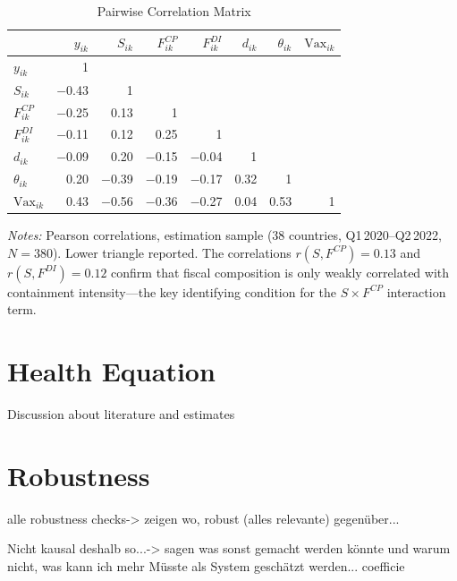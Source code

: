 \documentclass[12pt, a4paper]{article}
\begin{document}
\begin{table}[H]
\centering
\caption{Pairwise Correlation Matrix}
\label{tab:corr_matrix}
\scriptsize
\begin{tabular}{@{} l r r r r r r r @{}}
\toprule
 & $y_{ik}$ & $S_{ik}$ & $F^{CP}_{ik}$ & $F^{DI}_{ik}$
 & $d_{ik}$ & $\theta_{ik}$ & $\text{Vax}_{ik}$ \\
\midrule
$y_{ik}$           & 1    &       &       &       &       &       &  \\
$S_{ik}$           & $-$0.43 & 1  &       &       &       &       &  \\
$F^{CP}_{ik}$      & $-$0.25 & 0.13  & 1  &       &       &       &  \\
$F^{DI}_{ik}$      & $-$0.11 & 0.12  & 0.25  & 1  &       &       &  \\
$d_{ik}$           & $-$0.09 & 0.20  & $-$0.15 & $-$0.04 & 1  &       &  \\
$\theta_{ik}$      & 0.20  & $-$0.39 & $-$0.19 & $-$0.17 & 0.32  & 1  &  \\
$\text{Vax}_{ik}$  & 0.43  & $-$0.56 & $-$0.36 & $-$0.27 & 0.04  & 0.53  & 1 \\
\bottomrule
\end{tabular}
\vspace{4pt}

\parbox{\textwidth}{\scriptsize\textit{Notes:} Pearson correlations,
estimation sample (38 countries, Q1\,2020--Q2\,2022, $N = 380$).
Lower triangle reported. The correlations
$r(S, F^{CP}) = 0.13$ and $r(S, F^{DI}) = 0.12$ confirm that fiscal
composition is only weakly correlated with containment intensity---the
key identifying condition for the $S \times F^{CP}$ interaction term.}
\end{table}


\section{Health Equation}
\label{app:health_estimations}

Discussion about literature and estimates

\section{Robustness}
\label{app:robustness}


alle robustness checks-> zeigen wo, robust (alles relevante) gegenüber...

Nicht kausal deshalb so...-> sagen was sonst gemacht werden könnte und warum nicht, was kann ich mehr
Müsste als System geschätzt werden...
coefficie
\end{document}
